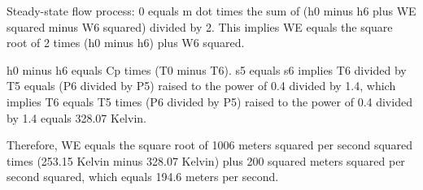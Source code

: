 Steady-state flow process: 0 equals m dot times the sum of (h0 minus h6 plus WE squared minus W6 squared) divided by 2. 
This implies WE equals the square root of 2 times (h0 minus h6) plus W6 squared.

h0 minus h6 equals Cp times (T0 minus T6).
s5 equals s6 implies T6 divided by T5 equals (P6 divided by P5) raised to the power of 0.4 divided by 1.4, which implies T6 equals T5 times (P6 divided by P5) raised to the power of 0.4 divided by 1.4 equals 328.07 Kelvin.

Therefore, WE equals the square root of 1006 meters squared per second squared times (253.15 Kelvin minus 328.07 Kelvin) plus 200 squared meters squared per second squared, which equals 194.6 meters per second.
